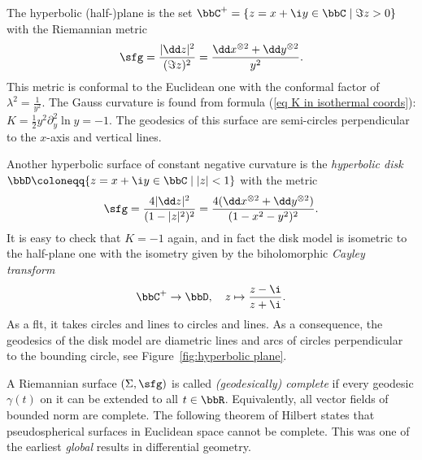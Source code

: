 \begin{example}
    The hyperbolic (half-)plane is the set $\bbC^+=\{z=x+\i y\in\bbC\mid \Im z>0\}$ with the Riemannian metric 
    \[\sfg=\frac{|\dd z|^2}{(\Im z)^2}=\frac{\dd x^{\otimes 2}+\dd y^{\otimes 2}}{y^2}.\]
    This metric is conformal to the Euclidean one with the conformal factor of $\lambda^2=\frac{1}{y^2}$. The Gauss curvature is found from formula (\ref{eq K in isothermal coords}): $K=\frac12y^2\partial_y^2\ln y=-1$. The geodesics of this surface are semi-circles perpendicular to the $x$-axis and vertical lines.
    
    Another hyperbolic surface of constant negative curvature is the \emph{hyperbolic disk}  $\bbD\coloneqq \{z=x+\i y\in\bbC \mid |z|<1\}$ with the metric 
    \[\sfg=\frac{4|\dd z|^2}{(1-|z|^2)^2}=\frac{4(\dd x^{\otimes 2}+\dd y^{\otimes 2})}{(1-x^2-y^2)^2}.\]
    It is easy to check that $K=-1$ again, and in fact the disk model is isometric to the half-plane one with the isometry given by the biholomorphic \emph{Cayley transform} 
    \[\bbC^+\to \bbD,\quad z\mapsto \frac{z-\i }{z+\i}.\]
    As a \gls{flt}, it takes circles and lines to circles and lines. As a consequence, the geodesics of the disk model are diametric lines and arcs of circles perpendicular to the bounding circle, see Figure~\ref{fig:hyperbolic plane}.
\end{example}


A Riemannian surface $(\Sigma,\sfg)$ is called \emph{(geodesically) complete} if every geodesic $\gamma(t)$ on it can be extended to all $t\in\bbR$. Equivalently, all vector fields of bounded norm are complete. The following theorem of Hilbert states that pseudospherical surfaces in Euclidean space cannot be complete. This was one of the earliest \emph{global} results in differential geometry. 

